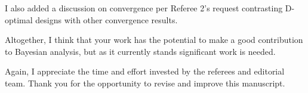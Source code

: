 \documentclass{article}
\begin{document}
\AR I also added a discussion on convergence per Referee 2's request
contrasting D-optimal designs with other convergence results.

\RC Altogether, I think that your work has the potential to make a
good contribution to Bayesian analysis, but as it currently stands
significant work is needed.

\AR Again, I appreciate the time and effort invested by the referees
and editorial team. Thank you for the opportunity to revise and
improve this manuscript.










\end{document}
